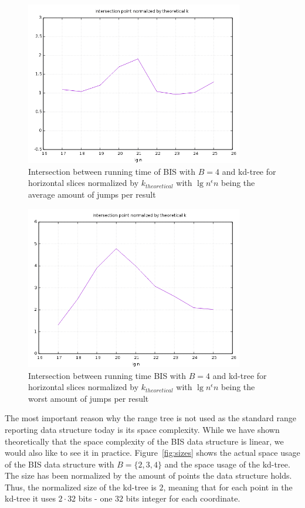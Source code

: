 \begin{figure}[h]
    \centering
    \includegraphics[width = 0.85\textwidth]{pictures/analysis/fours/hori_avg.png}
    \caption{Intersection between running time of BIS with $B=4$ and kd-tree for horizontal slices normalized by $k_{theoretical}$ with $\lg n^\epsilon n$ being the average amount of jumps per result}\label{fig:b4_hori_theory}
\end{figure}

\begin{figure}[h]
    \centering
    \includegraphics[width = 0.85\textwidth]{pictures/analysis/fours/hori_worst.png}
    \caption{Intersection between running time BIS with $B=4$ and kd-tree for horizontal slices normalized by $k_{theoretical}$ with $\lg n^\epsilon n$ being the worst amount of jumps per result}\label{fig:b4_hori_theory_worst}
\end{figure}


The most important reason why the range tree is not used as the standard range reporting data structure today is its space complexity. While we have shown theoretically that the space complexity of the BIS data structure is linear, we would also like to see it in practice. Figure~\ref{fig:sizes} shows the actual space usage of the BIS data structure with $B=\{2,3,4\}$ and the space usage of the kd-tree. The size has been normalized by the amount of points the data structure holds. Thus, the normalized size of the kd-tree is $2$, meaning that for each point in the kd-tree it uses $2\cdot 32$ bits - one $32$ bits integer for each coordinate.


